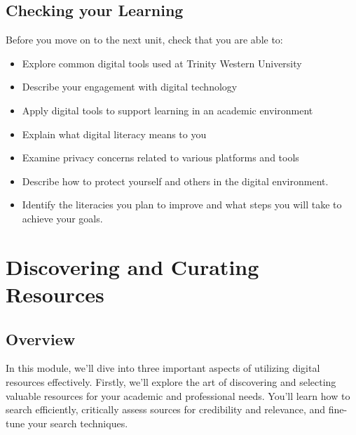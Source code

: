 \documentclass[
]{book}
\providecommand{\tightlist}{%
  \setlength{\itemsep}{0pt}\setlength{\parskip}{0pt}}
\theoremstyle{definition}
\theoremstyle{definition}
\theoremstyle{definition}
\theoremstyle{definition}
\theoremstyle{remark}
\begin{document}
\hypertarget{checking-your-learning}{%
\section*{Checking your Learning}\label{checking-your-learning}}

\begin{progress}
Before you move on to the next unit, check that you are able to:

\begin{itemize}
\tightlist
\item
  Explore common digital tools used at Trinity Western University
\item
  Describe your engagement with digital technology\\
\item
  Apply digital tools to support learning in an academic environment\\
\item
  Explain what digital literacy means to you\\
\item
  Examine privacy concerns related to various platforms and tools\\
\item
  Describe how to protect yourself and others in the digital environment.\\
\item
  Identify the literacies you plan to improve and what steps you will take to achieve your goals.
\end{itemize}
\end{progress}

\hypertarget{discovering-and-curating-resources}{%
\chapter{Discovering and Curating Resources}\label{discovering-and-curating-resources}}

\hypertarget{overview-1}{%
\section*{Overview}\label{overview-1}}

In this module, we'll dive into three important aspects of utilizing digital resources effectively. Firstly, we'll explore the art of discovering and selecting valuable resources for your academic and professional needs. You'll learn how to search efficiently, critically assess sources for credibility and relevance, and fine-tune your search techniques.
\end{document}
